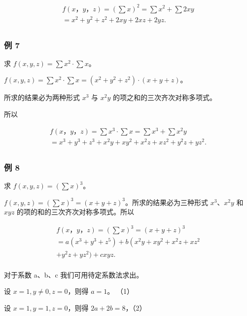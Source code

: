 \[
\begin{array}{l} f (x\text{，} y\text{，} z) = (\sum x) ^ {2} = \sum x ^ {2} + \sum 2 x y \\ = x ^ {2} + y ^ {2} + z ^ {2} + 2 x y + 2 x z + 2 y z. \\ \end{array}
\]

\subsubsection{例 7}

求 \(f(x, y, z) = \sum x^2 \cdot \sum x\)。

\(f(x, y, z) = \sum x^2 \cdot \sum x = (x^2 + y^2 + z^2) \cdot (x + y + z)\)。

所求的结果必为两种形式 \(x^{3}\) 与 \(x^{2}y\)
的项之和的三次齐次对称多项式。

所以

\[
\begin{array}{l} f (x\text{，} y\text{，} z) = \sum x ^ {3} \cdot \sum x = \sum x ^ {3} + \sum x ^ {2} y \\ = x ^ {3} + y ^ {3} + z ^ {3} + x ^ {2} y + x y ^ {2} + x ^ {2} z + x z ^ {2} + y ^ {2} z + y z ^ {2}. \\ \end{array}
\]

\subsubsection{例 8}

求 \(f(x, y, z) = (\sum x)^3\)。

\(f(x, y, z) = (\sum x)^3 = (x + y + z)^3\)。所求的结果必为三种形式
\(x^3\)、\(x^2y\) 和 \(xyz\) 的项的和的三次齐次对称多项式。所以

\[
\begin{array}{l} f (x\text{，} y\text{，} z) = (\sum x) ^ {3} = (x + y + z) ^ {3} \\ = a \left(x ^ {3} + y ^ {3} + z ^ {5}\right) + b \left(x ^ {2} y + x y ^ {2} + x ^ {2} z + x z ^ {2} \right. \\ + y ^ {2} z + y z ^ {2}) + c x y z. \\ \end{array}
\]

对于系数 a、b、c 我们可用待定系数法求出。

设 \(x = 1, y \neq 0, z = 0\)，则得 \(a = 1\)。 （1）

设 \(x = 1, y = 1, z = 0\)，则得 \(2a + 2b = 8\)，（2）

